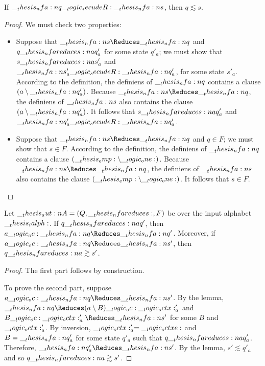 \begin{lemma}
  If $\__thesis_nfa:n {q} \__logic_secudeR: \__thesis_nfa:n {s}$, then $q \lesssim s$.
\end{lemma}
\begin{proof}
  We must check two properties:
  \begin{itemize}
  \item Suppose that $\nfa{s} \Reduces \nfa{q}$ and $q \nfareduces[a] q'_a$ for some state $q'_a$; we must show that $s \nfareduces[a] s'_a$ and $\__thesis_nfa:n {s}'_a \__logic_secudeR: \__thesis_nfa:n {q}'_a$, for some state $s'_a$.
    According to the definition, the definiens of $\__thesis_nfa:n {q}$ contains a clause $(a \mathbin { \setminus } \__thesis_nfa:n {q}'_a)$.
    Because $\nfa{s} \Reduces \nfa{q}$, the definiens of $\__thesis_nfa:n {s}$ also contains the clause $(a \mathbin { \setminus } \__thesis_nfa:n {q}'_a)$.
    It follows that $s \nfareduces[a] q'_a$ and $\__thesis_nfa:n {q}'_a \__logic_secudeR: \__thesis_nfa:n {q}'_a$.
  \item Suppose that $\nfa{s} \Reduces \nfa{q}$ and $q \in F$; we must show that $s \in F$.
    According to the definition, the definiens of $\__thesis_nfa:n {q}$ contains a clause $(\__thesis_emp: \mathbin { \setminus } \__logic_one:)$.
    Because $\nfa{s} \Reduces \nfa{q}$, the definiens of $\__thesis_nfa:n {s}$ also contains the clause $(\__thesis_emp: \mathbin { \setminus } \__logic_one:)$.
    It follows that $s \in F$.
  \qedhere
  \end{itemize}
\end{proof}


\begin{theorem}[Adequacy]
  Let $\aut{A} = (Q, \mathord{\nfareduces}, F)$ be  over the input alphabet $\__thesis_ialph:$.
  If $q \nfareduces[a] q'$, then $a \oc \nfa{q} \Reduces \nfa{q}'$.
  Moreover, if $a \oc \nfa{q} \Reduces \nfa{s}'$, then $q \nfareduces[a]\gtrsim s'$.
\end{theorem}
%
\begin{proof}
  The first part follows by construction.

  To prove the second part, suppose $a \oc \nfa{q} \Reduces \nfa{s}'$.
  By the lemma, $\nfa{q} \Reduces (a \limp B) \oc \octx'_a$ and $B \oc \octx'_a \Reduces \nfa{s}'$ for some $B$ and $\__logic_octx:'_a$.
  By inversion, $\__logic_octx:'_a = \__logic_octxe:$ and $B = \__thesis_nfa:n {q}'_a$ for some state $q'_a$ such that $q \nfareduces[a] q'_a$.
  Therefore, $\nfa{q}'_a \Reduces \nfa{s}'$.
  By the lemma, $s' \lesssim q'_a$ and so $q \nfareduces[a]\gtrsim s'$.
\end{proof}


